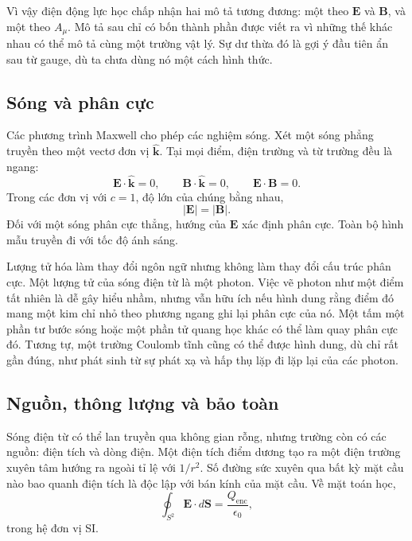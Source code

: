 Vì vậy điện động lực học chấp nhận hai mô tả tương đương: một theo \(\boldsymbol E\) và \(\boldsymbol B\), và một theo \(A_\mu\). Mô tả sau chỉ có bốn thành phần được viết ra vì những thế khác nhau có thể mô tả cùng một trường vật lý. Sự dư thừa đó là gợi ý đầu tiên ẩn sau từ gauge, dù ta chưa dùng nó một cách hình thức.

\subsection{Sóng và phân cực}

Các phương trình Maxwell cho phép các nghiệm sóng. Xét một sóng phẳng truyền theo một vectơ đơn vị \(\hat{\boldsymbol k}\). Tại mọi điểm, điện trường và từ trường đều là ngang:
\begin{equation}
\boldsymbol E\cdot\hat{\boldsymbol k}=0,
\qquad
\boldsymbol B\cdot\hat{\boldsymbol k}=0,
\qquad
\boldsymbol E\cdot\boldsymbol B=0.
\end{equation}
Trong các đơn vị với \(c=1\), độ lớn của chúng bằng nhau,
\begin{equation}
|\boldsymbol E|=|\boldsymbol B|.
\end{equation}
Đối với một sóng phân cực thẳng, hướng của \(\boldsymbol E\) xác định phân cực. Toàn bộ hình mẫu truyền đi với tốc độ ánh sáng.

Lượng tử hóa làm thay đổi ngôn ngữ nhưng không làm thay đổi cấu trúc phân cực. Một lượng tử của sóng điện từ là một photon. Việc vẽ photon như một điểm tất nhiên là dễ gây hiểu nhầm, nhưng vẫn hữu ích nếu hình dung rằng điểm đó mang một kim chỉ nhỏ theo phương ngang ghi lại phân cực của nó. Một tấm một phần tư bước sóng hoặc một phần tử quang học khác có thể làm quay phân cực đó. Tương tự, một trường Coulomb tĩnh cũng có thể được hình dung, dù chỉ rất gần đúng, như phát sinh từ sự phát xạ và hấp thụ lặp đi lặp lại của các photon.

\subsection{Nguồn, thông lượng và bảo toàn}

Sóng điện từ có thể lan truyền qua không gian rỗng, nhưng trường còn có các nguồn: điện tích và dòng điện. Một điện tích điểm dương tạo ra một điện trường xuyên tâm hướng ra ngoài tỉ lệ với \(1/r^2\). Số đường sức xuyên qua bất kỳ mặt cầu nào bao quanh điện tích là độc lập với bán kính của mặt cầu. Về mặt toán học,
\begin{equation}
\oint_{S^2}\boldsymbol E\cdot d\boldsymbol S
=\frac{Q_{\mathrm{enc}}}{\epsilon_0},
\label{eq:l5-gauss}
\end{equation}
trong hệ đơn vị SI.

